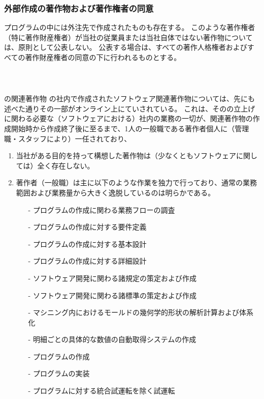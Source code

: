\subsubsection{外部作成の著作物および著作権者の同意\label{subsec:copyrightsSubcontractor}}
プログラムの中には外注先で作成されたものも存在する。
このような著作権者（特に著作財産権者）が当社の従業員または当社自体ではない著作物については、原則として公表しない。
公表する場合は、すべての著作人格権者およびすべての著作財産権者の同意の下に行われるものとする。



\clearpage
~\vfill
\begin{Column}{\DMname の関連著作物}
\DMname の社内で作成されたソフトウェア関連著作物については、先にも述べた通りその一部がオンライン上にていされている。
これは、その\DMname の立上げに関わる必要な（ソフトウェアにおける）社内の業務の一切が、関連著作物の作成開始時から作成終了後に至るまで、1人の一般職である著作者個人に（管理職・スタッフにより）一任されており、
\begin{enumerate}[label=\Roman*]
\item 当社がある目的を持って構想した著作物は（少なくともソフトウェアに関しては）全く存在しない。
\item
著作者（一般職）は主に以下のような作業を独力で行っており、通常の業務範囲および業務量から大きく逸脱しているのは明らかである。
  \begin{enumerate}
  \item[-] プログラムの作成に関わる業務フローの調査
  \item[-] プログラムの作成に対する要件定義
  \item[-] プログラムの作成に対する基本設計
  \item[-] プログラムの作成に対する詳細設計
  \item[-] ソフトウェア開発に関わる諸規定の策定および作成
  \item[-] ソフトウェア開発に関わる諸標準の策定および作成
  \item[-] マシニング内におけるモールドの幾何学的形状の解析計算および体系化
  \item[-] 明細ごとの具体的な数値の自動取得システムの作成
  \item[-] プログラムの作成
  \item[-] プログラムの実装
  \item[-] プログラムに対する統合試運転を除く試運転

\end{enumerate}
\end{enumerate}
\end{Column}
